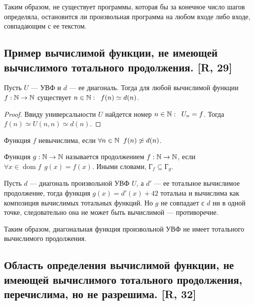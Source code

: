 \documentclass[a4paper, fleqn]{article}
\DeclareMathOperator{\dom}{\mathop{\mathrm{dom}}}
\newcommand{\plot}{\text{Г}} %
\begin{document}
        Таким образом, не существует программы, которая бы за конечное число шагов определяла, остановится ли произвольная программа на любом входе либо входе, совпадающим с ее текстом.

    \subsection{Пример вычислимой функции, не имеющей вычислимого тотального продолжения. [R, 29]}

        \begin{proposition}
        Пусть $U$ --- УВФ и $d$ --- ее диагональ. Тогда для любой вычислимой функции $f : \mathbb{N} \to \mathbb{N}$ существует $n \in \mathbb{N} : \;\; f(n) \simeq d(n)$.
        \end{proposition}

        \begin{proof}
        Ввиду универсальности $U$ найдется номер $n \in \mathbb{N} : \;\; U_n = f$. Тогда $f(n) \simeq U(n, n) \simeq d(n)$.
        \end{proof}

        \begin{corollary}
        Функция $f$ невычислима, если $\forall n \in \mathbb{N} \;\; f(n) \not\simeq d(n)$.
        \end{corollary}

        \begin{definition}
        Функция $g : \mathbb{N} \to \mathbb{N}$ называется продолжением $f : \mathbb{N} \to \mathbb{N}$, если $\forall x \in \dom f \;\, g(x) = f(x)$. Иными словами, $\plot_f \subseteq \plot_g$.
        \end{definition}

        Пусть $d$ --- диагональ произвольной УВФ $U$, а $d'$ --- ее тотальное вычислимое продолжение, тогда функция $g(x) = d'(x) + 42$ тотальна и вычислима как композиция вычислимых тотальных функций. Но $g$ не совпадает с $d$ ни в одной точке, следовательно она не может быть вычислимой --- противоречие.

        Таким образом, диагональная функция произвольной УВФ не имеет тотального вычислимого продолжения.

    \subsection{Область определения вычислимой функции, не имеющей вычислимого тотального продолжения, перечислима, но не разрешима. [R, 32]}
\end{document}
